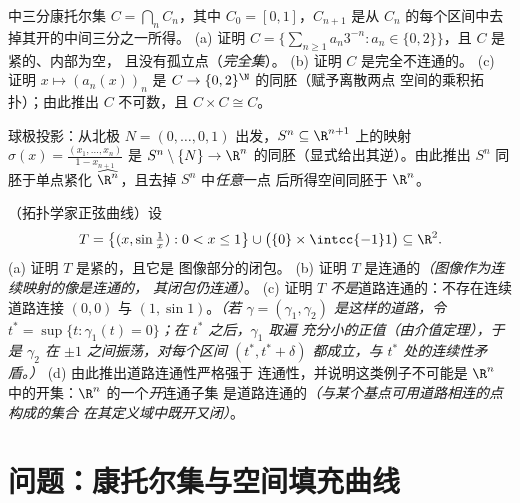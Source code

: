 \begin{exercise}[$\star\star\star$]\label{exo:b3:topology:10}
中三分康托尔集 $C = \bigcap_n C_n$，其中 $C_0 =
[0,1]$，$C_{n+1}$ 是从
$C_n$ 的每个区间中去掉其开的中间三分之一所得。
(a) 证明 $C = \bigl\{\sum_{n\geq1} a_n3^{-n} : a_n \in
\{0,2\}\bigr\}$，且 $C$ 是紧的、内部为空，
且没有孤立点（\emph{完全集}）。
(b) 证明 $C$ 是完全不连通的。
(c) 证明 $x \mapsto (a_n(x))_n$ 是 $C \to
\{0,2\}^\N$ 的同胚（赋予离散两点
空间的乘积拓扑）；由此推出 $C$ 不可数，且 $C \times C
\cong C$。
\end{exercise}

\begin{exercise}[$\star\star\star$]\label{exo:b3:topology:11}
球极投影：从北极 $N = (0, \dots,
0, 1)$ 出发，$S^n \subseteq \R^{n+1}$ 上的映射 $\sigma(x) =
\frac{(x_1, \dots, x_n)}{1 - x_{n+1}}$ 是 $S^n
\setminus \{N\} \to \R^n$ 的同胚（显式给出其逆）。由此推出
$S^n$ 同胚于单点紧化
$\widehat{\R^n}$，且去掉 $S^n$ 中\emph{任意}一点
后所得空间同胚于 $\R^n$。
\end{exercise}

\begin{exercise}[$\star\star\star$]\label{exo:b3:topology:12}
（拓扑学家正弦曲线）设
\[
T = \bigl\{(x, \sin\tfrac1x) : 0 < x \leq 1\bigr\}
\cup \bigl(\{0\}\times\intcc{-1}1\bigr) \subseteq \R^2 .
\]
(a) 证明 $T$ 是紧的，且它是
图像部分的闭包。
(b) 证明 $T$ 是连通的\emph{（图像作为连续映射的像是连通的，
其闭包仍连通）}。
(c) 证明 $T$ \emph{不是}道路连通的：不存在连续
道路连接 $(0,0)$ 与 $(1, \sin1)$。\emph{（若 $\gamma =
(\gamma_1, \gamma_2)$ 是这样的道路，令 $t^* = \sup\{t :
\gamma_1(t) = 0\}$；在 $t^*$ 之后，$\gamma_1$ 取遍
充分小的正值（由介值定理），于是
$\gamma_2$ 在 $\pm1$ 之间振荡，对每个区间
$(t^*, t^* + \delta)$ 都成立，与 $t^*$ 处的连续性矛盾。）}
(d) 由此推出道路连通性严格强于
连通性，并说明这类例子不可能是
$\R^n$ 中的开集：$\R^n$ 的一个\emph{开}连通子集
是道路连通的\emph{（与某个基点可用道路相连的点构成的集合
在其定义域中既开又闭）}。
\end{exercise}

\section{问题：康托尔集与空间填充曲线}

